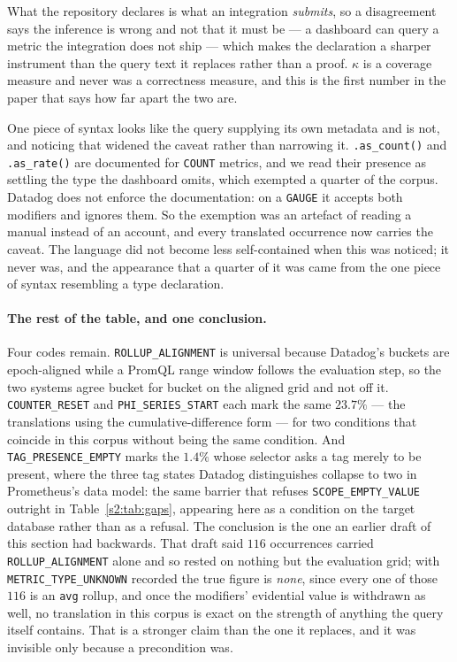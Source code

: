 What the repository declares is what an integration \emph{submits}, so a disagreement says
the inference is wrong and not that it must be --- a dashboard can query a metric the
integration does not ship --- which makes the declaration a sharper instrument than the
query text it replaces rather than a proof. $\kappa$ is a coverage measure and never was a
correctness measure, and this is the first number in the paper that says how far apart the
two are.

One piece of syntax looks like the query supplying its own metadata and is not, and
noticing that widened the caveat rather than narrowing it. \texttt{.as\_count()} and
\texttt{.as\_rate()} are documented for \texttt{COUNT} metrics, and we read their presence
as settling the type the dashboard omits, which exempted a quarter of the corpus. Datadog
does not enforce the documentation: on a \texttt{GAUGE} it accepts both modifiers and
ignores them. So the exemption was an artefact of reading a manual instead of an account,
and every translated occurrence now carries the caveat. The language did not become less
self-contained when this was noticed; it never was, and the appearance that a quarter of it
was came from the one piece of syntax resembling a type declaration.

\paragraph{The rest of the table, and one conclusion.}
Four codes remain. \texttt{ROLLUP\_ALIGNMENT} is universal because Datadog's buckets are
epoch-aligned while a PromQL range window follows the evaluation step, so the two systems
agree bucket for bucket on the aligned grid and not off it. \texttt{COUNTER\_RESET} and
\texttt{PHI\_SERIES\_START} each mark the same $23.7\%$ --- the translations using the
cumulative-difference form --- for two conditions that coincide in this corpus without
being the same condition. And \texttt{TAG\_PRESENCE\_EMPTY} marks the $1.4\%$ whose
selector asks a tag merely to be present, where the three tag states Datadog distinguishes
collapse to two in Prometheus's data model: the same barrier that refuses
\texttt{SCOPE\_EMPTY\_VALUE} outright in Table~\ref{s2:tab:gaps}, appearing here as a
condition on the target database rather than as a refusal. The conclusion is the one an
earlier draft of this section had backwards. That draft said $116$ occurrences carried
\texttt{ROLLUP\_ALIGNMENT} alone and so rested on nothing but the evaluation grid; with
\texttt{METRIC\_TYPE\_UNKNOWN} recorded the true figure is \emph{none}, since every one of
those $116$ is an \texttt{avg} rollup, and once the modifiers' evidential value is
withdrawn as well, no translation in this corpus is exact on the strength of anything the
query itself contains. That is a stronger claim than the one it replaces, and it was
invisible only because a precondition was.

